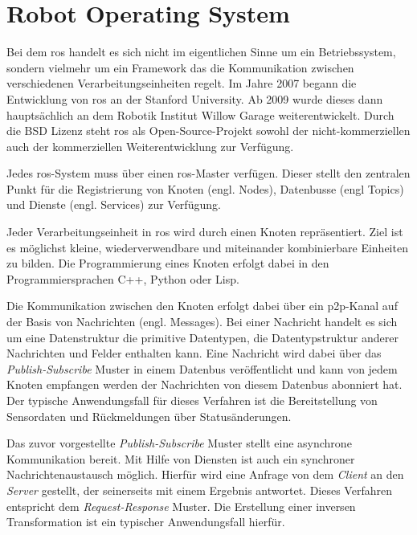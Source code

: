 


%
%
\section{Robot Operating System}

Bei dem \Gls{ros} handelt es sich nicht im eigentlichen Sinne um ein Betriebssystem, sondern vielmehr um ein Framework das die Kommunikation zwischen verschiedenen Verarbeitungseinheiten regelt. Im Jahre 2007 begann die Entwicklung von \Gls{ros} an der Stanford University. Ab 2009 wurde dieses dann hauptsächlich an dem Robotik Institut Willow Garage weiterentwickelt. Durch die BSD Lizenz steht \Gls{ros} als Open-Source-Projekt sowohl der nicht-kommerziellen auch der kommerziellen Weiterentwicklung zur Verfügung. \cite{quigley2009ros}

Jedes \Gls{ros}-System muss über einen \Gls{ros}-Master verfügen. Dieser stellt den zentralen Punkt für die Registrierung von Knoten (engl. Nodes), Datenbusse (engl Topics) und Dienste (engl. Services) zur Verfügung.

Jeder Verarbeitungseinheit in \Gls{ros} wird durch einen Knoten repräsentiert. Ziel ist es möglichst kleine, wiederverwendbare und miteinander kombinierbare Einheiten zu bilden. Die Programmierung eines Knoten erfolgt dabei in den Programmiersprachen C++, Python oder Lisp.

Die Kommunikation zwischen den Knoten erfolgt dabei über ein \Gls{p2p}-Kanal auf der Basis von Nachrichten (engl. Messages). Bei einer Nachricht handelt es sich um eine Datenstruktur die primitive Datentypen, die Datentypstruktur anderer Nachrichten und Felder enthalten kann. Eine Nachricht wird dabei über das \textit{Publish-Subscribe} Muster in einem Datenbus veröffentlicht und kann von jedem Knoten empfangen werden der Nachrichten von diesem Datenbus abonniert hat. Der typische Anwendungsfall für dieses Verfahren ist die Bereitstellung von Sensordaten und Rückmeldungen über Statusänderungen.

Das zuvor vorgestellte \textit{Publish-Subscribe} Muster stellt eine asynchrone Kommunikation bereit. Mit Hilfe von Diensten ist auch ein synchroner Nachrichtenaustausch möglich. Hierfür wird eine Anfrage von dem \textit{Client} an den \textit{Server} gestellt, der seinerseits mit einem Ergebnis antwortet. Dieses Verfahren entspricht dem \textit{Request-Response} Muster. Die Erstellung einer inversen Transformation ist ein typischer Anwendungsfall hierfür.

